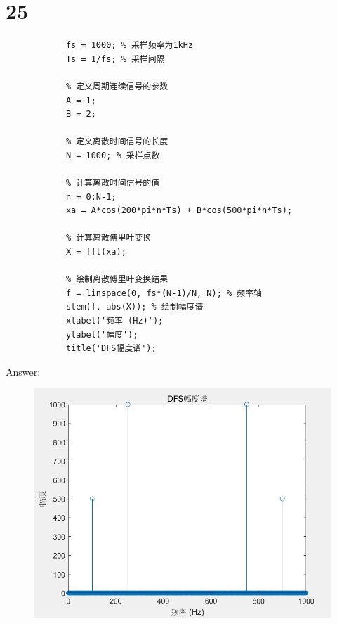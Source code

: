 \documentclass{article}
\begin{document}
    \section*{25}
        \begin{lstlisting}[caption={题25 MATLAB代码}, label={lst:matlab}]
            % 定义采样频率和采样间隔
            fs = 1000; % 采样频率为1kHz
            Ts = 1/fs; % 采样间隔

            % 定义周期连续信号的参数
            A = 1;
            B = 2;

            % 定义离散时间信号的长度
            N = 1000; % 采样点数

            % 计算离散时间信号的值
            n = 0:N-1;
            xa = A*cos(200*pi*n*Ts) + B*cos(500*pi*n*Ts);

            % 计算离散傅里叶变换
            X = fft(xa);

            % 绘制离散傅里叶变换结果
            f = linspace(0, fs*(N-1)/N, N); % 频率轴
            stem(f, abs(X)); % 绘制幅度谱
            xlabel('频率 (Hz)');
            ylabel('幅度');
            title('DFS幅度谱');

        \end{lstlisting}
        Answer:
            \begin{figure}[h]
                \includegraphics{25.png}
            \end{figure}
            \FloatBarrier
\end{document}
